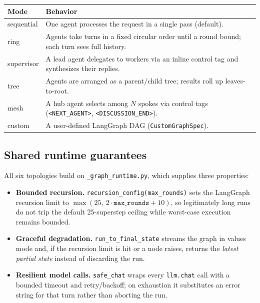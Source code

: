 \documentclass[conference]{IEEEtran}
\begin{document}
\begin{center}
\footnotesize
\begin{tabular}{@{}l>{\raggedright\arraybackslash}p{6.4cm}@{}}
\toprule
\textbf{Mode} & \textbf{Behavior} \\
\midrule
sequential & One agent processes the request in a single pass (default). \\
ring & Agents take turns in a fixed circular order until a round bound; each turn sees full history. \\
supervisor & A lead agent delegates to workers via an inline control tag and synthesizes their replies. \\
tree & Agents are arranged as a parent/child tree; results roll up leaves-to-root. \\
mesh & A hub agent selects among $N$ spokes via control tags (\texttt{<NEXT\_AGENT>}, \texttt{<DISCUSSION\_END>}). \\
custom & A user-defined LangGraph DAG (\texttt{CustomGraphSpec}). \\
\bottomrule
\end{tabular}
\end{center}

\subsection{Shared runtime guarantees}

All six topologies build on \texttt{\_graph\_runtime.py}, which supplies
three properties:

\begin{itemize}
    \item \textbf{Bounded recursion.} \texttt{recursion\_config(max\_rounds)}
    sets the LangGraph recursion limit to
    $\max(25,\ 2\cdot\mathtt{max\_rounds}+10)$, so legitimately long runs
    do not trip the default 25-superstep ceiling while worst-case
    execution remains bounded.
    \item \textbf{Graceful degradation.} \texttt{run\_to\_final\_state}
    streams the graph in values mode and, if the recursion limit is hit or
    a node raises, returns the \emph{latest partial state} instead of
    discarding the run.
    \item \textbf{Resilient model calls.} \texttt{safe\_chat} wraps every
    \texttt{llm.chat} call with a bounded timeout and retry/backoff; on
    exhaustion it substitutes an error string for that turn rather than
    aborting the run.
\end{itemize}
\end{document}
